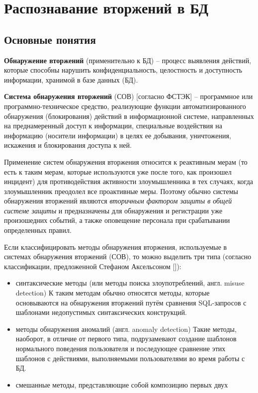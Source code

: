 \section{Распознавание вторжений в БД}


\subsection{Основные понятия}

\textbf{Обнаружение вторжений} (применительно к БД) -- процесс выявления действий, 
которые способны нарушить конфиденциальность, целостность и доступность информации, 
хранимой в базе данных (БД).

\textbf{Система обнаружения вторжений} (СОВ) [согласно ФСТЭК] -- программное или программно-техническое 
средство, реализующие функции автоматизированного обнаружения (блокирования) действий в информационной системе, 
направленных на преднамеренный доступ к информации, специальные воздействия на информацию (носители информации) 
в целях ее добывания, уничтожения, искажения и блокирования доступа к ней.

Применение систем обнаружения вторжения относится к реактивным мерам (то есть к таким мерам, которые 
используются уже после того, как произошел инцидент) для противодействия активности злоумышленника в тех 
случаях, когда злоумышленник преодолел все проактивные меры. Поэтому обычно системы обнаружения вторжений 
являются \textit{вторичным фактором защиты в общей системе защиты} и предназначены для обнаружения и регистрации
уже произошедних событий, а также оповещение персонала при срабатывании определенных правил.

Если классифицировать методы обнаружения вторжения, используемые в системах обнаружения вторжений (СОВ), 
то можно выделить три типа (согласно классификации, предложенной Стефаном Аксельсоном [\cite{IDSClassification}]):
\begin{itemize}
	\item синтаксические методы (или методы поиска злоупотреблений, англ. misuse detection)
		К таким методам обычно относятся методы, которые основываются на обнаружения вторжений 
		путём сравнения SQL-запросов с шаблонами недопустимых синтаксических конструкций.
	\item методы обнаружения аномалий (англ. anomaly detection)
		Такие методы, наоборот, в отличие от первого типа, подрузамевают создание шаблонов нормального 
		поведения пользователя и последующее сравнение этих шаблонов с действиями, выполняемыми пользователями 
		во время работы с БД.
	\item смешанные методы, представляющие собой композицию первых двух
\end{itemize}



